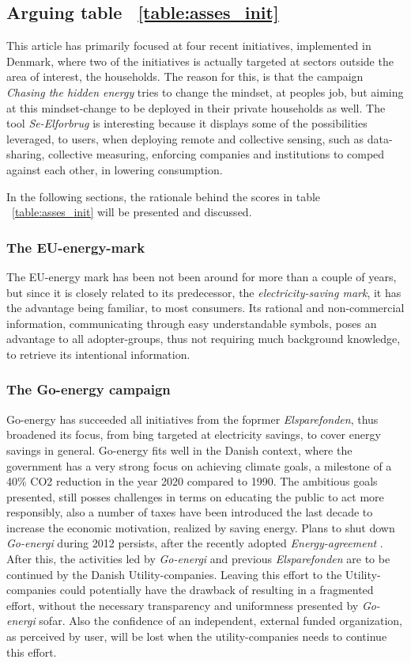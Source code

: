 \documentclass[journal]{IEEEtran}
\begin{document}
\subsection{Arguing table ~\ref{table:asses_init}}
This article has primarily focused at four recent initiatives, implemented in Denmark, where two of the initiatives is actually targeted at sectors outside the area of interest, the households. The reason for this, is that the campaign \textit{Chasing the hidden energy} tries to change the mindset, at peoples job, but aiming at this mindset-change to be deployed in their private households as well. The tool \textit{Se-Elforbrug} is interesting because it displays some of the possibilities leveraged, to users, when deploying remote and collective sensing, such as data-sharing, collective measuring, enforcing companies and institutions to comped against each other, in lowering consumption.\newline

In the following sections, the rationale behind the scores in table  ~\ref{table:asses_init}
will be presented and discussed.

\subsubsection{The EU-energy-mark}
The EU-energy mark has been not been around for more than a couple of years, but since it is closely related to its predecessor, the \textit{electricity-saving mark}, it has the advantage being familiar, to most consumers. Its rational and non-commercial information, communicating through easy understandable symbols, poses an advantage to all adopter-groups, thus not requiring much background knowledge, to retrieve its intentional information.

\subsubsection{The Go-energy campaign}
Go-energy has succeeded all initiatives from the foprmer \textit{Elsparefonden}, thus broadened its focus, from bing targeted at electricity savings, to cover energy savings in general. Go-energy fits well in the Danish context, where the government has a very strong focus on achieving climate goals, a milestone of a 40\% CO2 reduction in the year 2020 compared to 1990. The ambitious goals presented, still posses challenges in terms on educating the public to act more responsibly, also a number of taxes have been introduced the last decade to increase the economic motivation, realized by saving energy. 
Plans to shut down \textit{Go-energi} during 2012 \cite{luk_ge} persists, after the recently adopted \textit{Energy-agreement} \cite{energipolitik_2020}. After this, the activities led by \textit{Go-energi} and previous \textit{Elsparefonden} are to be continued by the Danish Utility-companies.
Leaving this effort to the Utility-companies could potentially have the drawback of resulting in a fragmented effort, without the necessary transparency and uniformness presented by \textit{Go-energi} sofar. Also the confidence of an independent, external funded organization, as perceived by user, will be lost when the utility-companies needs to continue this effort. 
\end{document}
